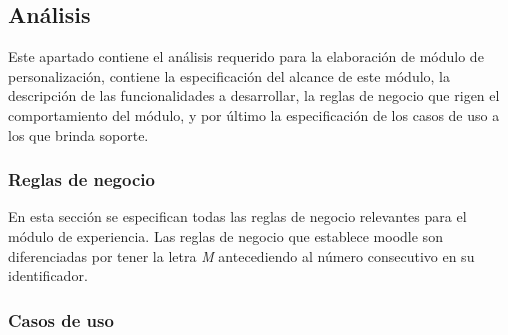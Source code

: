 
\subsection{Análisis}

 Este apartado contiene el análisis requerido para la elaboración de módulo de personalización,
 contiene la especificación del alcance de este módulo, la descripción de las funcionalidades
 a desarrollar, la reglas de negocio que rigen el comportamiento del módulo, y por último la
 especificación de los casos de uso a los que brinda soporte.



\subsubsection{Reglas de negocio} %

 En esta sección se especifican todas las reglas de negocio relevantes para el módulo de
 experiencia. Las reglas de negocio que establece moodle son diferenciadas por tener la letra {\it M}
 antecediendo al número consecutivo en su identificador.


    
\clearpage


%
%



\subsubsection{Casos de uso} %

